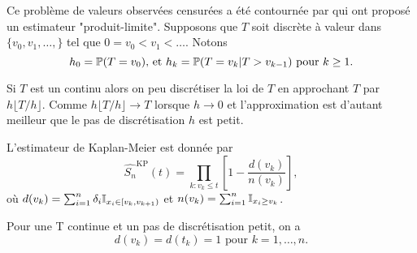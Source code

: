 Ce problème de valeurs observées censurées a été contournée par \citet{Kaplan1958} qui ont proposé un estimateur "produit-limite". Supposons que $T$ soit discrète à valeur dans $\{v_0,v_1,\ldots,\}$ tel que $0=v_0<v_1<\ldots$. Notons 
$$
h_0 =\mathbb{P}(T=v_0)\text{, et } h_k=\mathbb{P}(T=v_k|T> v_{k-1})\text{ pour } k\geq 1.
$$
\begin{remark}
Si $T$ est un \va continu alors on peu discrétiser la loi de $T$ en approchant $T$ par $h\lfloor T/h\rfloor$. Comme $h\lfloor T/h\rfloor\rightarrow T$ lorsque $h\rightarrow 0$ et l'approximation est d'autant meilleur que le pas de discrétisation $h$ est petit. 
\end{remark}
\begin{theo}
L'estimateur de Kaplan-Meier est donnée par 
\begin{equation}\label{eq:estimateur_KP}
\widehat{S_n}^{\text{KP}}(t) = \prod_{k: v_k\leq t}\left[1-\frac{d(v_k)}{n(v_k)}\right],
\end{equation}
où $d(v_k) = \sum_{i = 1}^n\delta_i\mathbb{I}_{x_i\in [v_k,v_{k+1})}$ et $n(v_k) = \sum_{i = 1}^n\mathbb{I}_{x_i\geq v_k}$. 
\end{theo}
\begin{remark}
Pour une \va T continue et un pas de discrétisation petit, on a 
$$
d(v_k) = d(t_k) = 1\text{ pour }k = 1,\ldots, n.
$$
\end{remark}
